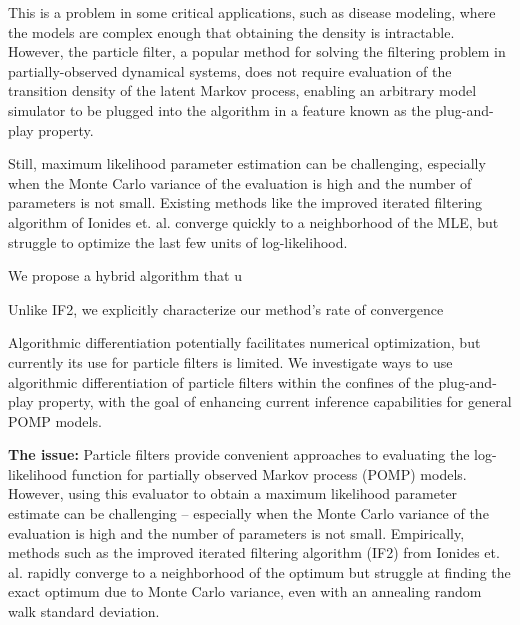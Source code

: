 \documentclass[9pt,twocolumn,twoside]{pnas-new}
\begin{document}
This is a problem in some critical applications, such as disease modeling, where the models are complex enough that obtaining the density is intractable. However, the particle filter, a popular method for solving the filtering problem in partially-observed dynamical systems, does not require evaluation of the transition density of the latent Markov process, enabling an arbitrary model simulator to be plugged into the algorithm in a feature known as the plug-and-play property. 

Still, maximum likelihood parameter estimation can be challenging, especially when the Monte Carlo variance of the evaluation is high and the number of parameters is not small. Existing methods like the improved iterated filtering algorithm of Ionides et. al. \cite{Ionides_infpomp} converge quickly to a neighborhood of the MLE, but struggle to optimize the last few units of log-likelihood. 




We propose a hybrid algorithm that u

Unlike IF2, we explicitly characterize our method's rate of convergence



Algorithmic differentiation potentially facilitates numerical optimization, but currently its use for particle filters is limited. We investigate ways to use algorithmic differentiation of particle filters within the confines of the plug-and-play property, with the goal of enhancing current inference capabilities for general POMP models.


\textbf{The issue:} Particle filters provide convenient approaches to evaluating the log-likelihood function for partially observed Markov process (POMP) models. However, using this evaluator to obtain a maximum likelihood parameter estimate can be challenging -- especially when the Monte Carlo variance of the evaluation is high and the number of parameters is not small. Empirically, methods such as the improved iterated filtering algorithm (IF2) from Ionides et. al. \cite{Ionides_infpomp} rapidly converge to a neighborhood of the optimum but struggle at finding the exact optimum due to Monte Carlo variance, even with an annealing random walk standard deviation. 
\end{document}
